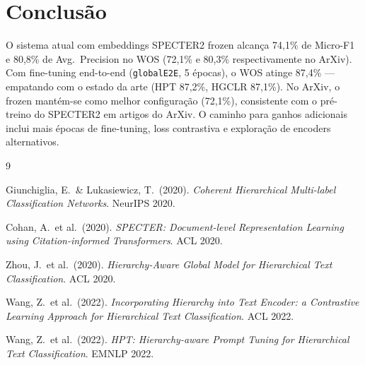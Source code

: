 \documentclass[11pt,a4paper]{article}
\begin{document}
\section{Conclusão}

O sistema atual com embeddings \textsc{SPECTER2} frozen alcança 74,1\% de Micro-F1
e 80,8\% de Avg.\ Precision no WOS (72,1\% e 80,3\% respectivamente no ArXiv).
Com fine-tuning end-to-end (\texttt{globalE2E}, 5 épocas), o WOS atinge 87,4\% ---
empatando com o estado da arte (HPT 87,2\%, HGCLR 87,1\%). No ArXiv, o frozen
mantém-se como melhor configuração (72,1\%), consistente com o pré-treino do
SPECTER2 em artigos do ArXiv. O caminho para ganhos adicionais inclui mais épocas
de fine-tuning, loss contrastiva e exploração de encoders alternativos.


\begin{thebibliography}{9}

Giunchiglia, E.\ \& Lukasiewicz, T.\ (2020).
\textit{Coherent Hierarchical Multi-label Classification Networks}.
NeurIPS 2020.

Cohan, A.\ et al.\ (2020).
\textit{SPECTER: Document-level Representation Learning using
Citation-informed Transformers}.
ACL 2020.

Zhou, J.\ et al.\ (2020).
\textit{Hierarchy-Aware Global Model for Hierarchical Text Classification}.
ACL 2020.

Wang, Z.\ et al.\ (2022).
\textit{Incorporating Hierarchy into Text Encoder: a Contrastive Learning
Approach for Hierarchical Text Classification}.
ACL 2022.

Wang, Z.\ et al.\ (2022).
\textit{HPT: Hierarchy-aware Prompt Tuning for Hierarchical Text Classification}.
EMNLP 2022.

\end{thebibliography}
\end{document}
